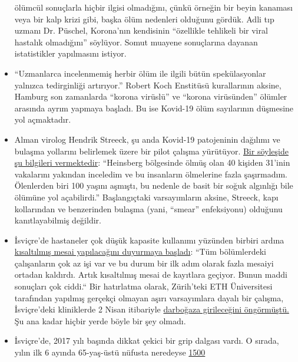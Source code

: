 \begin{itemize}
  ölümcül sonuçlarla hiçbir ilgisi olmadığını, çünkü örneğin bir beyin
  kanaması veya bir kalp krizi gibi, başka ölüm nedenleri olduğunu
  gördük. Adli tıp uzmanı Dr. Püschel, Korona'nın kendisinin ``özellikle
  tehlikeli bir viral hastalık olmadığını'' söylüyor. Somut muayene
  sonuçlarına dayanan istatistikler yapılmasını istiyor.
\item
  ``Uzmanlarca incelenmemiş herbir ölüm ile ilgili bütün spekülasyonlar
  yalnızca tedirginliği artırıyor.'' Robert Koch Enstitüsü kurallarının
  aksine, Hamburg son zamanlarda ``korona virüslü'' ve ``korona
  virüsünden'' ölümler arasında ayrım yapmaya başladı. Bu ise Kovid-19
  ölüm sayılarının düşmesine yol açmaktadır.
\item
  Alman virolog Hendrik Streeck, şu anda Kovid-19 patojeninin dağılımı
  ve bulaşma yollarını belirlemek üzere bir pilot çalışma yürütüyor.
  \href{https://www.zeit.de/wissen/gesundheit/2020-04/hendrik-streeck-covid-19-heinsberg-symptome-infektionsschutz-massnahmen-studie/komplettansicht}{Bir
  söyleşide şu bilgileri vermektedir}: ``Heinsberg bölgesinde ölmüş olan
  40 kişiden 31'inin vakalarını yakından inceledim ve bu insanların
  ölmelerine fazla şaşırmadım. Ölenlerden biri 100 yaşını aşmıştı, bu
  nedenle de basit bir soğuk algınlığı bile ölümüne yol açabilirdi.''
  Başlangıçtaki varsayımların aksine, Streeck, kapı kollarından ve
  benzerinden bulaşma (yani, ``smear'' enfeksiyonu) olduğunu
  kanıtlayabilmiş değildir.
\item
  İsviçre'de hastaneler çok düşük kapasite kullanımı yüzünden birbiri
  ardına
  \href{https://www.engadinerpost.ch/2020/4/04/Engadiner-Spitaeler-haben-freie-Kapazitaeten}{kısaltılmış
  mesai yapılacağını duyurmaya başladı}: ``Tüm bölümlerdeki çalışanların
  çok az işi var ve bu durum bir ilk adım olarak fazla mesaiyi ortadan
  kaldırdı. Artık kısaltılmış mesai de kayıtlara geçiyor. Bunun maddi
  sonuçları çok ciddi.`` Bir hatırlatma olarak, Zürih'teki ETH
  Üniversitesi tarafından yapılmış gerçekçi olmayan aşırı varsayımlara
  dayalı bir çalışma, İsviçre'deki kliniklerde 2 Nisan itibariyle
  \href{https://www.toponline.ch/news/coronavirus/detail/news/studie-bestaetigt-engpass-bei-spitalbetten-steht-kurz-bevor-00131333/}{darboğaza
  girileceğini öngörmüştü.} Şu ana kadar hiçbir yerde böyle bir şey
  olmadı.
\item
  İsviçre'de, 2017 yılı başında dikkat çekici bir grip dalgası vardı. O
  sırada, yılın ilk 6 ayında 65-yaş-üstü nüfusta neredeyse
  \href{https://www.srf.ch/news/schweiz/todesursachen-statistik-woran-die-meisten-schweizerinnen-und-schweizer-sterben}{1500
}
\end{itemize}
